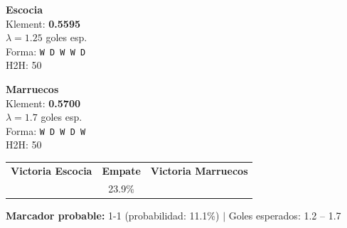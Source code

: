 \documentclass[11pt,a4paper]{article}
\begin{document}
\begin{tcolorbox}[colback=yellow!5, colframe=yellow!60!black, arc=5pt, 
  title={\textbf{Grupo C: Escocia \textbf{vs} Marruecos}}]

\begin{minipage}{0.48\textwidth}
  \centering
  {\Large\bfseries Escocia}\\[3pt]
  Klement: \textbf{0.5595} \\
  $\lambda = 1.25$ goles esp. \\
  Forma: \texttt{W D W W D}\\ 
  H2H: 50%
\end{minipage}
\hfill
\begin{minipage}{0.04\textwidth}
\end{minipage}
\hfill
\begin{minipage}{0.48\textwidth}
  \centering
  {\Large\bfseries Marruecos}\\[3pt]
  Klement: \textbf{0.5700} \\
  $\lambda = 1.7$ goles esp. \\
  Forma: \texttt{W D W D W}\\ 
  H2H: 50%
\end{minipage}

\vspace{0.4cm}
\centering
\begin{tabular}{ccc}
  \textbf{Victoria Escocia} & \textbf{Empate} & \textbf{Victoria Marruecos} \\[3pt]
  \cellcolor{red!25}{\LARGE\bfseries 28.2\%}
  & {\LARGE 23.9\%}
  & \cellcolor{yellow!25}{\LARGE\bfseries 47.9\%} \\
\end{tabular}

\vspace{0.3cm}
\textbf{Marcador probable:} 1-1 (probabilidad: 11.1\%)
\quad $|$ \quad Goles esperados: 1.2 -- 1.7
\end{tcolorbox}
\end{document}
